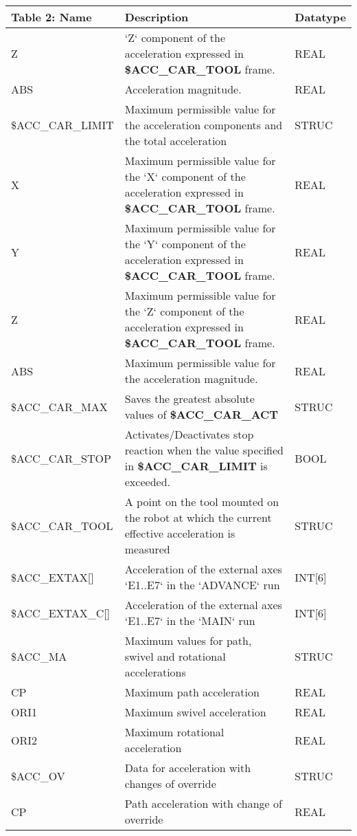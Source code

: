 \begin{appendices}
        \newpage
        \begin{tabular}{|p{}|p{}|p{}|}
        \hline
        \textbf{Table 2: Name} & \textbf{Description} & \textbf{Datatype} \\ \hline
        \quad Z & `Z` component of the acceleration expressed in \textbf{\$ACC\_CAR\_TOOL} frame. & REAL \\ \hline
        \quad ABS & Acceleration magnitude. & REAL \\ \hline
        \$ACC\_CAR\_LIMIT & Maximum permissible value for the acceleration components and the total acceleration & STRUC \\ \hline
        \quad X & Maximum permissible value for the `X` component of the acceleration expressed in \textbf{\$ACC\_CAR\_TOOL} frame. & REAL \\ \hline
        \quad Y & Maximum permissible value for the `Y` component of the acceleration expressed in \textbf{\$ACC\_CAR\_TOOL} frame. & REAL \\ \hline
        \quad Z & Maximum permissible value for the `Z` component of the acceleration expressed in \textbf{\$ACC\_CAR\_TOOL} frame. & REAL \\ \hline
        \quad ABS & Maximum permissible value for the acceleration magnitude. & REAL \\ \hline
        \$ACC\_CAR\_MAX & Saves the greatest absolute values of \textbf{\$ACC\_CAR\_ACT} & STRUC \\ \hline
        \$ACC\_CAR\_STOP & Activates/Deactivates stop reaction when the value specified in \textbf{\$ACC\_CAR\_LIMIT} is exceeded. & BOOL \\ \hline
        \$ACC\_CAR\_TOOL & A point on the tool mounted on the robot at which the current effective acceleration is measured & STRUC \\ \hline
        \$ACC\_EXTAX[] & Acceleration of the external axes `E1..E7` in the `ADVANCE` run & INT[6] \\ \hline
        \$ACC\_EXTAX\_C[] & Acceleration of the external axes `E1..E7` in the `MAIN` run & INT[6] \\ \hline
        \$ACC\_MA & Maximum values for path, swivel and rotational accelerations & STRUC \\ \hline
        \quad CP & Maximum path acceleration & REAL \\ \hline
        \quad ORI1 & Maximum swivel acceleration & REAL \\ \hline
        \quad ORI2 & Maximum rotational acceleration & REAL \\ \hline
        \$ACC\_OV & Data for acceleration with changes of override & STRUC \\ \hline
        \quad CP & Path acceleration with change of override & REAL \\ \hline
        \end{tabular}
        

\end{appendices}
